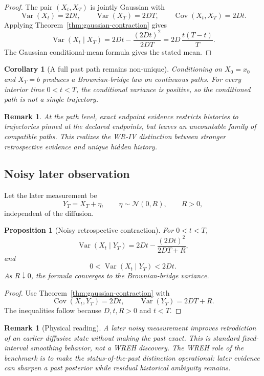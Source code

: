 \documentclass[11pt]{article}
\newtheorem{proposition}[definition]{Proposition}
\newtheorem{corollary}[definition]{Corollary}
\newtheorem{remark}[definition]{Remark}
\begin{document}
\begin{proof}
The pair \((X_t,X_T)\) is jointly Gaussian with
\[
\operatorname{Var}(X_t)=2Dt,
\qquad
\operatorname{Var}(X_T)=2DT,
\qquad
\operatorname{Cov}(X_t,X_T)=2Dt.
\]
Applying Theorem~\ref{thm:gaussian-contraction} gives
\[
\operatorname{Var}(X_t\mid X_T)
=
2Dt-\frac{(2Dt)^2}{2DT}
=
2D\,\frac{t(T-t)}{T}.
\]
The Gaussian conditional-mean formula gives the stated mean.
\end{proof}

\begin{corollary}[A full past path remains non-unique]
Conditioning on \(X_0=x_0\) and \(X_T=b\) produces a Brownian-bridge law on continuous
paths. For every interior time \(0<t<T\), the conditional variance is positive, so the
conditioned path is not a single trajectory.
\end{corollary}

\begin{remark}
At the path level, exact endpoint evidence restricts histories to trajectories pinned at the
declared endpoints, but leaves an uncountable family of compatible paths. This realizes the
WR-IV distinction between stronger retrospective evidence and unique hidden history.
\end{remark}

\subsection{Noisy later observation}

Let the later measurement be
\[
Y_T=X_T+\eta,
\qquad
\eta\sim\mathcal N(0,R),
\qquad
R>0,
\]
independent of the diffusion.

\begin{proposition}[Noisy retrospective contraction]
For \(0<t<T\),
\[
\operatorname{Var}(X_t\mid Y_T)
=
2Dt-\frac{(2Dt)^2}{2DT+R},
\]
and
\[
0<
\operatorname{Var}(X_t\mid Y_T)
<
2Dt.
\]
As \(R\downarrow0\), the formula converges to the Brownian-bridge variance.
\end{proposition}

\begin{proof}
Use Theorem~\ref{thm:gaussian-contraction} with
\[
\operatorname{Cov}(X_t,Y_T)=2Dt,
\qquad
\operatorname{Var}(Y_T)=2DT+R.
\]
The inequalities follow because \(D,t,R>0\) and \(t<T\).
\end{proof}

\begin{remark}[Physical reading]
A later noisy measurement improves retrodiction of an earlier diffusive state without making
the past exact. This is standard fixed-interval smoothing behavior, not a WREH discovery.
The WREH role of the benchmark is to make the status-of-the-past distinction operational:
later evidence can sharpen a past posterior while residual historical ambiguity remains.
\end{remark}
\end{document}
